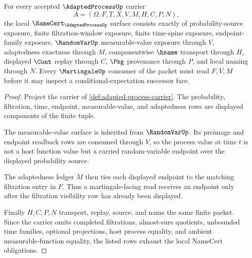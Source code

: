 \begin{theorem}
\label{thm:adapted-process-namecert-obligations}
For every accepted $\AdaptedProcessUp$ carrier
$$
A=(\Omega,F,T,X,V,M,H,C,P,N),
$$
the local $\NameCert_{\AdaptedProcessUp}$ surface consists exactly of probability-source exposure, finite filtration-window exposure, finite time-spine exposure, endpoint-family exposure, $\RandomVarUp$ measurable-value exposure through $V$, adaptedness exactness through $M$, componentwise $\hsame$ transport through $H$, displayed $\Cont$ replay through $C$, $\Pkg$ provenance through $P$, and local naming through $N$. Every $\MartingaleUp$ consumer of the packet must read $F,V,M$ before it may inspect a conditional-expectation successor face.
\end{theorem}
\begin{proof}
Project the carrier of \autoref{def:adapted-process-carrier}. The probability, filtration, time, endpoint, measurable-value, and adaptedness rows are displayed components of the finite tuple.

The measurable-value surface is inherited from $\RandomVarUp$. Its preimage and endpoint readback rows are consumed through $V$, so the process value at time $t$ is not a host function value but a carried random-variable endpoint over the displayed probability source.

The adaptedness ledger $M$ then ties each displayed endpoint to the matching filtration entry in $F$. Thus a martingale-facing read receives an endpoint only after the filtration visibility row has already been displayed.

Finally $H,C,P,N$ transport, replay, source, and name the same finite packet. Since the carrier omits completed filtrations, almost-sure quotients, unbounded time families, optional projections, host process equality, and ambient measurable-function equality, the listed rows exhaust the local NameCert obligations.
\end{proof}

